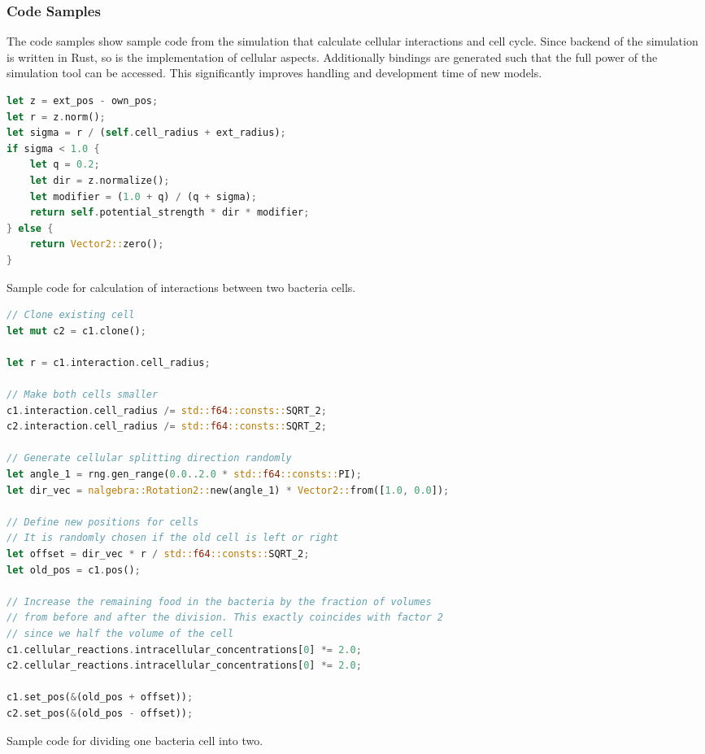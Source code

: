 \documentclass[10pt,A4paper]{article}
\numberwithin{equation}{section}
\begin{document}
\subsubsection{Code Samples}
The code samples show sample code from the simulation that calculate cellular interactions and cell cycle.
Since backend of the simulation is written in Rust, so is the implementation of cellular aspects.
Additionally bindings are generated such that the full power of the simulation tool can be accessed.
This significantly improves handling and development time of new models.
\begin{listing}
\begin{lstlisting}[language=rust]
let z = ext_pos - own_pos;
let r = z.norm();
let sigma = r / (self.cell_radius + ext_radius);
if sigma < 1.0 {
    let q = 0.2;
    let dir = z.normalize();
    let modifier = (1.0 + q) / (q + sigma);
    return self.potential_strength * dir * modifier;
} else {
    return Vector2::zero();
}
\end{lstlisting}
\caption{
    Sample code for calculation of interactions between two bacteria cells.
}
\label{listing:spatial-interaction-strength}
\end{listing}
%
%
\begin{listing}
\begin{lstlisting}[language=rust]
// Clone existing cell
let mut c2 = c1.clone();

let r = c1.interaction.cell_radius;

// Make both cells smaller
c1.interaction.cell_radius /= std::f64::consts::SQRT_2;
c2.interaction.cell_radius /= std::f64::consts::SQRT_2;

// Generate cellular splitting direction randomly
let angle_1 = rng.gen_range(0.0..2.0 * std::f64::consts::PI);
let dir_vec = nalgebra::Rotation2::new(angle_1) * Vector2::from([1.0, 0.0]);

// Define new positions for cells
// It is randomly chosen if the old cell is left or right
let offset = dir_vec * r / std::f64::consts::SQRT_2;
let old_pos = c1.pos();

// Increase the remaining food in the bacteria by the fraction of volumes
// from before and after the division. This exactly coincides with factor 2
// since we half the volume of the cell
c1.cellular_reactions.intracellular_concentrations[0] *= 2.0;
c2.cellular_reactions.intracellular_concentrations[0] *= 2.0;

c1.set_pos(&(old_pos + offset));
c2.set_pos(&(old_pos - offset));
\end{lstlisting}
\caption{
    Sample code for dividing one bacteria cell into two.
}
\end{listing}
%
%
\end{document}
